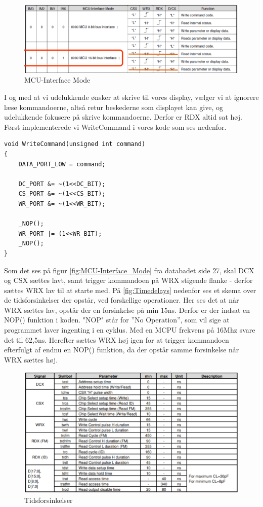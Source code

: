 \begin{figure}[H]
	\centering
	\includegraphics[width = 400pt]{Img/MCU-Interface_Mode.png}
	\caption{MCU-Interface Mode}
	\label{fig:MCU-Interface_Mode}
\end{figure}

I og med at vi udelukkende ønsker at skrive til vores display, vælger vi at ignorere læse kommandoerne, altså retur beskederne som displayet kan give, og udelukkende fokusere på skrive kommandoerne. Derfor er RDX altid sat høj.
Først implementerede vi WriteCommand i vores kode som ses nedenfor.


\begin{lstlisting}
void WriteCommand(unsigned int command)
{
	DATA_PORT_LOW = command;

	DC_PORT &= ~(1<<DC_BIT);
	CS_PORT &= ~(1<<CS_BIT);
	WR_PORT &= ~(1<<WR_BIT);
	
	_NOP();
	WR_PORT |= (1<<WR_BIT);
	_NOP();
}

\end{lstlisting}


Som det ses på figur \autoref{fig:MCU-Interface_Mode} fra databadet\cite{man:ILI9341} side 27, skal DCX og CSX sættes lavt, samt trigger kommandoen på WRX stigende flanke - derfor sættes WRX lav til at starte med. På \autoref{fig:Timedelays} nedenfor ses et skema over de tidsforsinkelser der opstår, ved forskellige operationer. Her ses det at når WRX sættes lav, opstår der en forsinkelse på min 15ns. Derfor er der indsat en NOP() funktion i koden. "NOP" står for ”No Operation”, som vil sige at programmet laver ingenting i en cyklus. Med en MCPU frekvens på 16Mhz svare det til 62,5ns. Herefter sættes WRX høj igen for at trigger kommandoen efterfulgt af endnu en NOP() funktion, da der opstår samme forsinkelse når WRX sættes høj.

\begin{figure}[H]
	\centering
	\includegraphics[width = 450pt]{Img/Timedelays.png}
	\caption{Tidsforsinkelser}
	\label{fig:Timedelays}
\end{figure}


